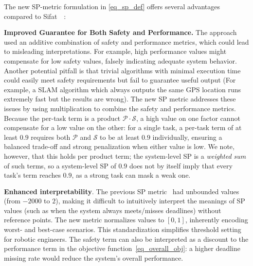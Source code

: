 
    The new SP-metric formulation in \eqref{eq_sp_def} offers several advantages compared to Sifat~\etal~\cite{Ash23RAL}:

    \textbf{Improved Guarantee for Both Safety and Performance.}
    The approach~\cite{Ash23RAL} used an additive combination of safety and performance metrics, which could lead to misleading interpretations.
    For example, high performance values might compensate for low safety values, falsely indicating adequate system behavior.
    Another potential pitfall is that trivial algorithms with minimal execution time could easily meet safety requirements but fail to guarantee useful output (For example, a SLAM algorithm which always outputs the same GPS location runs extremely fast but the results are wrong).
    The new SP metric addresses these issues by using multiplication to combine the safety and performance metrics.
    Because the per-task term is a product $\mathcal{P} \cdot \mathcal{S}$, a high value on one factor cannot compensate for a low value on the other: for a single task, a per-task term of at least $0.9$ requires both $\mathcal{P}$ and $\mathcal{S}$ to be at least $0.9$ individually, ensuring a balanced trade-off and strong penalization when either value is low.
    We note, however, that this holds per product term; the system-level SP is a \emph{weighted sum} of such terms, so a system-level SP of $0.9$ does not by itself imply that every task's term reaches $0.9$, as a strong task can mask a weak one.


    \textbf{Enhanced interpretability}.
    The previous SP metric~\cite{Ash23RAL} had unbounded values (\eg from $-2000$ to $2$), making it difficult to intuitively interpret the meanings of SP values (such as when the system always meets/misses deadlines) without reference points.
    The new metric normalizes values to $[0,1]$, inherently encoding worst- and best-case scenarios.
    This standardization simplifies threshold setting for robotic engineers.
    The safety term can also be interpreted as a discount to the performance term in the objective function~\eqref{eq_overall_obj}: a higher deadline missing rate would reduce the system's overall performance.






